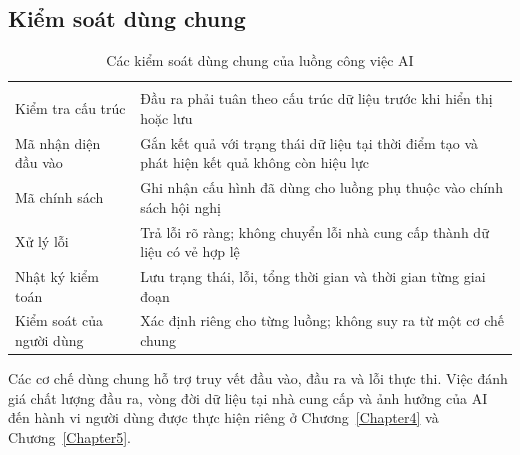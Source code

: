 \subsection{Kiểm soát dùng chung}

\begin{longtable}{|T{0.28\textwidth}|T{0.62\textwidth}|}
\caption{Các kiểm soát dùng chung của luồng công việc AI}\label{tab:appendix-a-ai-controls}\\
\hline
{} &  \\ \hline
\endfirsthead
\hline
{} &  \\ \hline
\endhead
Kiểm tra cấu trúc & Đầu ra phải tuân theo cấu trúc dữ liệu trước khi hiển thị hoặc lưu \\ \hline
Mã nhận diện đầu vào & Gắn kết quả với trạng thái dữ liệu tại thời điểm tạo và phát hiện kết quả không còn hiệu lực \\ \hline
Mã chính sách & Ghi nhận cấu hình đã dùng cho luồng phụ thuộc vào chính sách hội nghị \\ \hline
Xử lý lỗi & Trả lỗi rõ ràng; không chuyển lỗi nhà cung cấp thành dữ liệu có vẻ hợp lệ \\ \hline
Nhật ký kiểm toán & Lưu trạng thái, lỗi, tổng thời gian và thời gian từng giai đoạn \\ \hline
Kiểm soát của người dùng & Xác định riêng cho từng luồng; không suy ra từ một cơ chế chung \\ \hline
\end{longtable}

Các cơ chế dùng chung hỗ trợ truy vết đầu vào, đầu ra và lỗi thực thi. Việc đánh giá chất lượng đầu ra, vòng đời dữ liệu tại nhà cung cấp và ảnh hưởng của AI đến hành vi người dùng được thực hiện riêng ở Chương~\ref{Chapter4} và Chương~\ref{Chapter5}.
